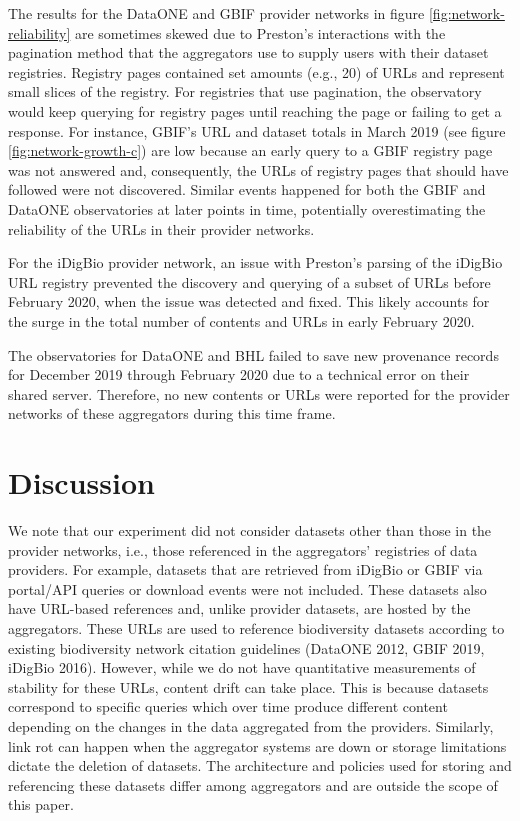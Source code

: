 The results for the DataONE and GBIF provider networks in figure \ref{fig:network-reliability} are sometimes skewed due to Preston's interactions with the pagination method that the aggregators use to supply users with their dataset registries. Registry pages contained set amounts (e.g., 20) of URLs and represent small slices of the registry. For registries that use pagination, the observatory would keep querying for registry pages until reaching the page or failing to get a response. For instance, GBIF's URL and dataset totals in March 2019 (see figure \ref{fig:network-growth-c}) are low because an early query to a GBIF registry page was not answered and, consequently, the URLs of registry pages that should have followed were not discovered. Similar events happened for both the GBIF and DataONE observatories at later points in time, potentially overestimating the reliability of the URLs in their provider networks.

For the iDigBio provider network, an issue with Preston's parsing of the iDigBio URL registry prevented the discovery and querying of a subset of URLs before February 2020, when the issue was detected and fixed. This likely accounts for the surge in the total number of contents and URLs in early February 2020.

The observatories for DataONE and BHL failed to save new provenance records for December 2019 through February 2020 due to a technical error on their shared server. Therefore, no new contents or URLs were reported for the provider networks of these aggregators during this time frame.


\section*{Discussion}
We note that our experiment did not consider datasets other than those in the provider networks, i.e., those referenced in the aggregators' registries of data providers. For example, datasets that are retrieved from iDigBio or GBIF via portal/API queries or download events were not included. These datasets also have URL-based references and, unlike provider datasets, are hosted by the aggregators. These URLs are used to reference biodiversity datasets according to existing biodiversity network citation guidelines (DataONE 2012, GBIF 2019, iDigBio 2016). However, while we do not have quantitative measurements of stability for these URLs, content drift can take place. This is because datasets correspond to specific queries which over time produce different content depending on the changes in the data aggregated from the providers. Similarly, link rot can happen when the aggregator systems are down or storage limitations dictate the deletion of datasets. The architecture and policies used for storing and referencing these datasets differ among aggregators and are outside the scope of this paper.


